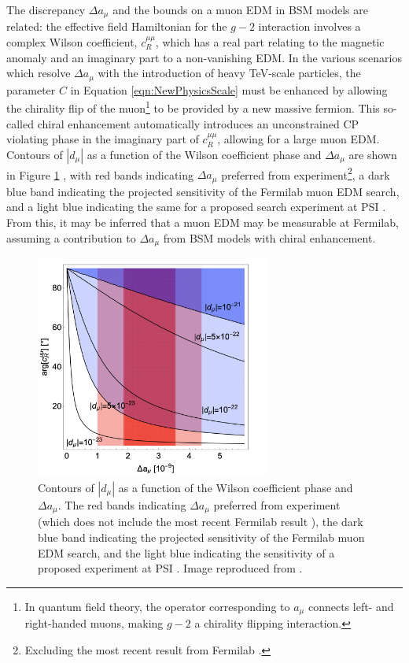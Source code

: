 The discrepancy $\Delta a_{\mu}$ and the bounds on a muon EDM in BSM models are related: the effective field Hamiltonian for the $g-2$ interaction involves a complex Wilson coefficient, $c_{R}^{\mu\mu}$, which has a real part relating to the magnetic anomaly and an imaginary part to a non-vanishing EDM. In the various scenarios which resolve $\Delta a_{\mu}$ with the introduction of heavy TeV-scale particles, the parameter $C$ in Equation \ref{eqn:NewPhysicsScale} must be enhanced by allowing the chirality flip of the muon\footnote{In quantum field theory, the operator corresponding to $a_{\mu}$ connects left- and right-handed muons, making $g-2$ a chirality flipping interaction.} to be provided by a new massive fermion. This so-called chiral enhancement automatically introduces an unconstrained CP violating phase in the imaginary part of $c_{R}^{\mu\mu}$, allowing for a large muon EDM. Contours of $|d_{\mu}|$ as a function of the Wilson coefficient phase and $\Delta a_{\mu}$ are shown in Figure \ref{fig:WilsonCoeff} \cite{CombinedExplantionsForaMuAndEDM2018} \cite{CombinedExplantionsForaMuAndEDM2020}, with red bands indicating $\Delta a_{\mu}$ preferred from experiment\footnote{Excluding the most recent result from Fermilab \cite{SummaryRun1}.}, a dark blue band indicating the projected sensitivity of the Fermilab muon EDM search, and a light blue indicating the same for a proposed search experiment at PSI \cite{PSI}. From this, it may be inferred that a muon EDM may be measurable at Fermilab, assuming a contribution to $\Delta a_{\mu}$ from BSM models with chiral enhancement.

\begin{figure}[t!]
\centering{}
\includegraphics[trim={0 0 0 0},clip,width=0.69\textwidth]{Images/Chapter1/WilsonCoeff.png}
\caption{Contours of $|d_{\mu}|$ as a function of the Wilson coefficient phase and $\Delta a_{\mu}$. The red bands indicating $\Delta a_{\mu}$ preferred from experiment (which does not include the most recent Fermilab result \cite{SummaryRun1}), the dark blue band indicating the projected sensitivity of the Fermilab muon EDM search, and the light blue indicating the sensitivity of a proposed experiment at PSI \cite{PSI}. Image reproduced from \cite{CombinedExplantionsForaMuAndEDM2018}.}
\label{fig:WilsonCoeff}
\end{figure}

